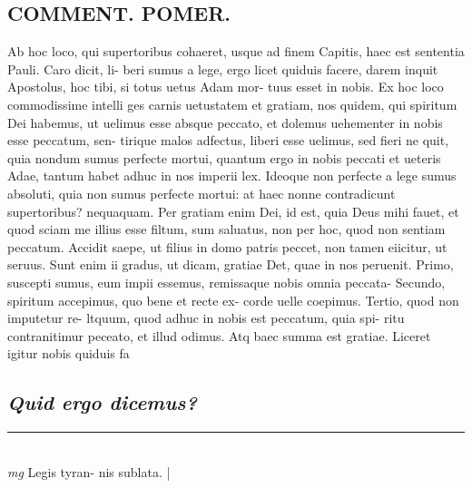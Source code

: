 \documentclass{article}
\begin{document}
\begin{pages}
\section*{COMMENT. POMER.  }\pstart Ab hoc loco, qui supertoribus cohaeret, usque ad finem Capitis, haec est sententia Pauli. Caro dicit, li- beri sumus a lege, ergo licet quiduis facere, darem inquit Apostolus, hoc tibi, si totus uetus Adam mor- tuus esset in nobis. Ex hoc loco commodissime intelli ges carnis uetustatem et gratiam, nos quidem, qui spiritum Dei habemus, ut uelimus esse absque peccato, et dolemus uehementer in nobis esse peccatum, sen- tirique malos adfectus, liberi esse uelimus, sed fieri ne quit, quia nondum sumus perfecte mortui, quantum ergo in nobis peccati et ueteris Adae, tantum habet adhuc in nos imperii lex. Ideoque non perfecte a lege sumus absoluti, quia non sumus perfecte mortui: at haec nonne contradicunt supertoribus? nequaquam.  Per gratiam enim Dei, id est, quia Deus mihi fauet, et quod sciam me illius esse filtum, sum saluatus, non per hoc, quod non sentiam peccatum. Accidit saepe, ut filius in domo patris peccet, non tamen eiicitur, ut seruus. Sunt enim ii gradus, ut dicam, gratiae Det, quae in nos peruenit. Primo, suscepti sumus, eum impii essemus, remissaque nobis omnia peccata- Secundo, spiritum accepimus, quo bene et recte ex- corde uelle coepimus. Tertio, quod non imputetur re- ltquum, quod adhuc in nobis est peccatum, quia spi- ritu contranitimur peceato, et illud odimus. Atq baec summa est gratiae. Liceret igitur nobis quiduis fa  \pend
{}
{}
\subsection*{\textit{Quid ergo dicemus? }}\pstart  \pend
\vspace{0.5cm}\noindent
\vspace{0.2cm}\rule{1cm}{0.2pt}\\ 
\hspace{0.2cm}\textit{mg}
\footnotesize Legis tyran- nis sublata.  
\normalsize| 

\end{pages}
\end{document}
